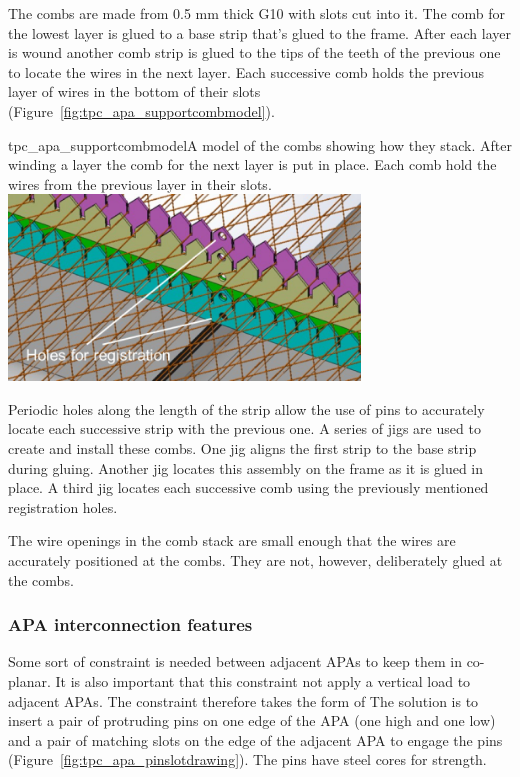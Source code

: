 
The combs are made from 0.5 mm thick G10 with slots cut into it.  The comb for the lowest layer is glued to a base strip that's glued to the frame.  After each layer is wound another comb strip is glued to the tips of the teeth of the previous one to locate the wires in the next layer.  Each successive comb holds the previous layer of wires in the bottom of their slots (Figure~\ref{fig:tpc_apa_supportcombmodel}).

\begin{cdrfigure}{tpc_apa_supportcombmodel}{A model of the combs showing how they stack.  After winding a layer the comb for the next layer is put in place.  Each comb hold the wires from the previous layer in their slots.}
\includegraphics[width=0.7\textwidth]{figures/tpc_apa_supportcombmodel.png} 
\end{cdrfigure}

Periodic holes along the length of the strip allow the use of pins to accurately locate each successive strip with the previous one.  A series of jigs are used to create and install these combs.  One jig aligns the first strip to the base strip during gluing.  Another jig locates this assembly on the frame as it is glued in place. A third jig locates each successive comb using the previously mentioned registration holes.

The wire openings in the comb stack are small enough that the wires are accurately positioned at the combs.  They are not, however, deliberately glued at the combs.  

\subsubsection{APA interconnection features}

Some sort of constraint is needed between adjacent APAs to keep them in co-planar.  It is also important that this constraint not apply a vertical load to adjacent APAs.  The constraint 
therefore takes the form of 
The solution is to insert a pair of protruding pins on one edge of the APA (one high and one low) and a pair of matching slots %
on the edge of the adjacent APA
to engage the pins (Figure~\ref{fig:tpc_apa_pinslotdrawing}). The pins have steel cores for strength.


